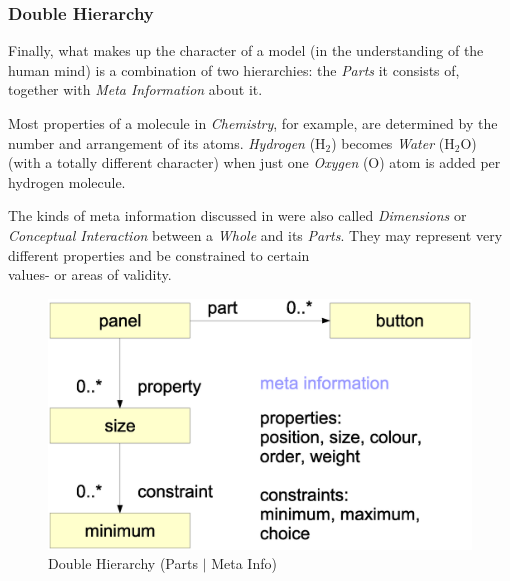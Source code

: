 %
%
%
%
%
%
%

\subsubsection{Double Hierarchy}
\label{double_hierarchy_heading}

Finally, what makes up the character of a model (in the understanding of the
human mind) is a combination of two hierarchies: the \emph{Parts} it consists
of, together with \emph{Meta Information} about it.

Most properties of a molecule in \emph{Chemistry}, for example, are determined
by the number and arrangement of its atoms. \emph{Hydrogen} (H$_{2}$) becomes
\emph{Water} (H$_{2}$O) (with a totally different character) when just one
\emph{Oxygen} (O) atom is added per hydrogen molecule.

The kinds of meta information discussed in \cite{heller2004} were also called
\emph{Dimensions} or \emph{Conceptual Interaction} between a \emph{Whole} and
its \emph{Parts}. They may represent very different properties and be
constrained to certain\\values- or areas of validity.

\begin{figure}[ht]
    \begin{center}
        \includegraphics[scale=0.2]{vector/double.eps}
        \caption{Double Hierarchy (Parts $\vert$ Meta Info)}
        \label{double_figure}
    \end{center}
\end{figure}

